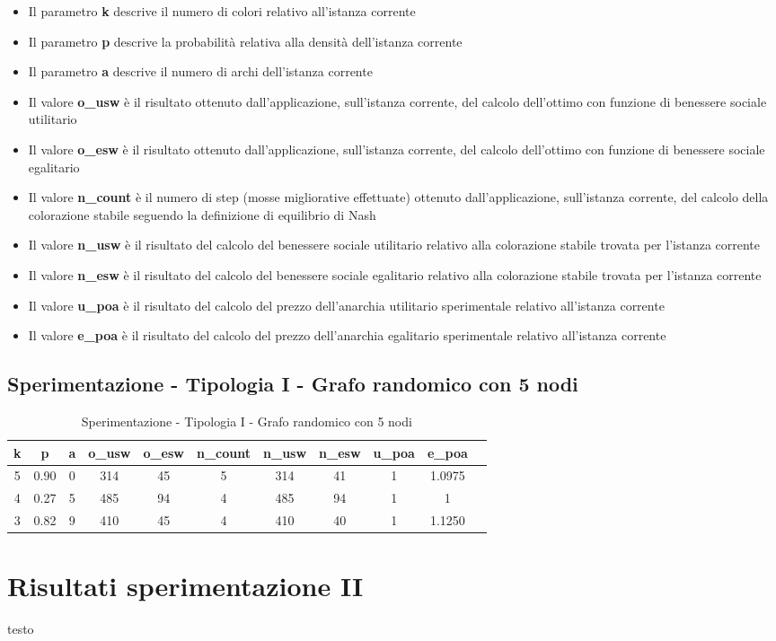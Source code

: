 \begin{itemize}
	\item Il parametro \textbf{k} descrive il numero di colori relativo all'istanza corrente
	\item Il parametro \textbf{p} descrive la probabilità relativa alla densità dell'istanza corrente
	\item Il parametro \textbf{a} descrive il numero di archi dell'istanza corrente
	\item Il valore \textbf{o\_usw} è il risultato ottenuto dall'applicazione, sull'istanza corrente, del calcolo dell'ottimo con funzione di benessere sociale utilitario
	\item Il valore \textbf{o\_esw} è il risultato ottenuto dall'applicazione, sull'istanza corrente, del calcolo dell'ottimo con funzione di benessere sociale egalitario
	\item Il valore \textbf{n\_count} è il numero di step (mosse migliorative effettuate) ottenuto dall'applicazione, sull'istanza corrente, del calcolo della colorazione stabile seguendo la definizione di equilibrio di Nash
	\item Il valore \textbf{n\_usw} è il risultato del calcolo del benessere sociale utilitario relativo alla colorazione stabile trovata per l'istanza corrente
	\item Il valore \textbf{n\_esw} è il risultato del calcolo del benessere sociale egalitario relativo alla colorazione stabile trovata per l'istanza corrente
	\item Il valore \textbf{u\_poa} è il risultato del calcolo del prezzo dell'anarchia utilitario sperimentale relativo all'istanza corrente
	\item Il valore \textbf{e\_poa} è il risultato del calcolo del prezzo dell'anarchia egalitario sperimentale relativo all'istanza corrente
\end{itemize}

\subsection{Sperimentazione - Tipologia I - Grafo randomico con 5 nodi}

\begin{table}[h]
\scalebox{1} {
\begin{tabular}{|c|c|c|c|c|c|c|c|c|c|c|}
\hline
\textbf{k} & \textbf{p} & \textbf{a} & \textbf{o\_usw} & \textbf{o\_esw} & \textbf{n\_count} & \textbf{n\_usw} & \textbf{n\_esw} & \textbf{u\_poa} & \textbf{e\_poa} \\ \hline
5 & 0.90 & 0 & 314 & 45 & 5 & 314 & 41 & 1 & 1.0975 \\ \hline
4 & 0.27 & 5 & 485 & 94 & 4 & 485 & 94 & 1 & 1 \\ \hline
3 & 0.82 & 9 & 410 & 45 & 4 & 410 & 40 & 1 & 1.1250 \\ \hline
\end{tabular}
}
\caption{Sperimentazione - Tipologia I - Grafo randomico con 5 nodi}
\label{tab:sperimentazione-tipo1-5nodi}
\end{table}

\section{Risultati sperimentazione II}
\justify
testo \\